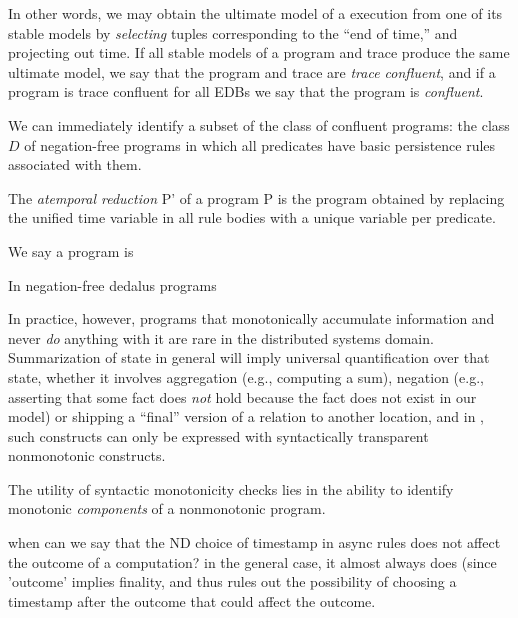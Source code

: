 In other words, we may obtain the ultimate model of a \lang execution from one of its stable
models by {\em selecting} tuples corresponding to the ``end of time,'' and projecting out time.
If all stable models of a \lang program and trace produce the same ultimate model, we say that the program and trace are \emph{trace confluent}, and if a program is trace confluent for all EDBs we say that the program is \emph{confluent}.

We can immediately identify a subset of the class of confluent programs:
the class $D$ of negation-free \lang programs in which all predicates have basic 
persistence rules associated with them.  

\begin{definition}
The \emph{atemporal reduction} P' of a \lang program P is the program obtained by replacing 
the unified time variable in all rule bodies with a unique variable per predicate.  
\end{definition}

We say a \lang program is \

\begin{lemma}
In negation-free dedalus programs
\end{lemma}


In practice, however, programs that monotonically accumulate information and never \emph{do} 
anything with it are rare in the distributed systems domain.  Summarization of state in 
general will imply universal quantification over that state, whether it involves aggregation (e.g., computing a sum), negation (e.g., asserting that some fact does \emph{not} hold because 
the fact does not exist in our model) or shipping a ``final'' version of a relation to another 
location, and in \lang, such constructs can only be expressed with syntactically transparent
nonmonotonic constructs.  

The utility of syntactic monotonicity checks lies in the ability to identify monotonic 
\emph{components} of a nonmonotonic program.



when can we say that the ND choice of timestamp in async rules does not affect the outcome
of a computation?  in the general case, it almost always does (since 'outcome' implies finality,
and thus rules out the possibility of choosing a timestamp after the outcome that could affect the outcome.

